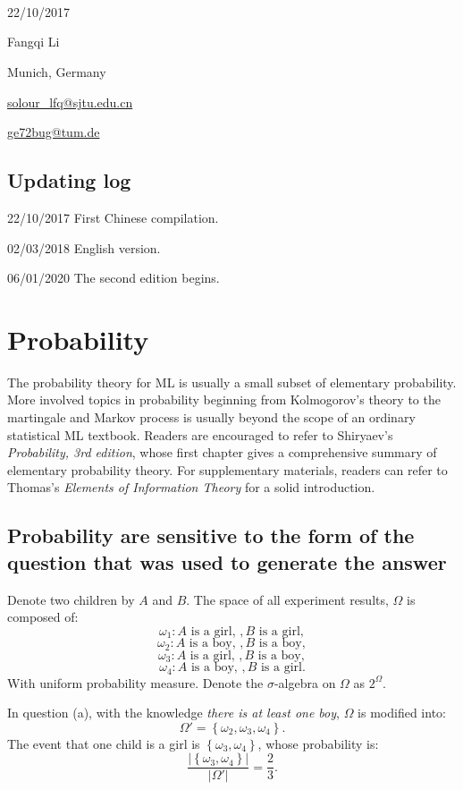 \documentclass[UTF8]{ctexart}
\begin{document}
\

\

\

22/10/2017

Fangqi Li

Munich, Germany

\url{solour_lfq@sjtu.edu.cn}

\url{ge72bug@tum.de}

\newpage
\subsection{Updating log}
22/10/2017 First Chinese compilation.

02/03/2018 English version.

06/01/2020 The second edition begins.

\newpage
\section{Probability}
The probability theory for ML is usually a small subset of elementary probability.
More involved topics in probability beginning from Kolmogorov's theory to the martingale and Markov process is usually beyond the scope of an ordinary statistical ML textbook.
Readers are encouraged to refer to Shiryaev's \emph{Probability, 3rd edition}, whose first chapter gives a comprehensive summary of elementary probability theory.
For supplementary materials, readers can refer to Thomas's \emph{Elements of Information Theory} for a solid introduction.

\subsection{Probability are sensitive to the form of the question that was used to generate the answer}
Denote two children by $A$ and $B$.
The space of all experiment results, $\Omega$ is composed of:
$$\omega_{1}:A\text{ is a girl, },B\text{ is a girl},$$
$$\omega_{2}:A\text{ is a boy, },B\text{ is a boy},$$
$$\omega_{3}:A\text{ is a girl, },B\text{ is a boy},$$
$$\omega_{4}:A\text{ is a boy, },B\text{ is a girl}.$$
With uniform probability measure.
Denote the $\sigma$-algebra on $\Omega$ as $2^{\Omega}$.

In question (a), with the knowledge \emph{there is at least one boy}, $\Omega$ is modified into:
$$\Omega'=\left\{\omega_{2},\omega_{3},\omega_{4} \right\}.$$
The event that one child is a girl is $\left\{\omega_{3},\omega_{4} \right\}$, whose probability is:
$$\frac{|\left\{\omega_{3},\omega_{4} \right\}|}{|\Omega'|}=\frac{2}{3}.$$
\end{document}
